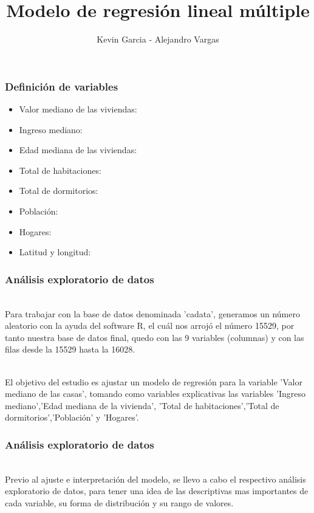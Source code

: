\documentclass[12pt]{beamer}
\author{Kevin Garcia - Alejandro Vargas}
\title{Modelo de regresión lineal múltiple}
\begin{document}
\begin{frame}
\titlepage
\end{frame}

\begin{frame}
\frametitle{Definición de variables}
\begin{itemize}
\item Valor mediano de las viviendas:
\item Ingreso mediano:
\item Edad mediana de las viviendas:
\item Total de habitaciones:
\item Total de dormitorios:
\item Población:
\item Hogares:
\item Latitud y longitud:
\end{itemize}
\end{frame}

\begin{frame}
\frametitle{Análisis exploratorio de datos}
~\\ Para trabajar con la base de datos denominada 'cadata', generamos un número aleatorio con la ayuda del software R, el cuál nos arrojó el número 15529, por tanto nuestra base de datos final, quedo con las 9 variables (columnas) y con las filas desde la 15529 hasta la 16028.

~\\ El objetivo del estudio es ajustar un modelo de regresión para la variable 'Valor mediano de las casas', tomando como variables explicativas las variables 'Ingreso mediano','Edad mediana de la vivienda', 'Total de habitaciones','Total de dormitorios','Población' y 'Hogares'. 
\end{frame}

\begin{frame}
\frametitle{Análisis exploratorio de datos}
~\\ Previo al ajuste e interpretación del modelo, se llevo a cabo el respectivo análisis exploratorio de datos, para tener una idea de las descriptivas mas importantes de cada variable, su forma de distribución y su rango de valores.
\end{frame}
\end{document}
